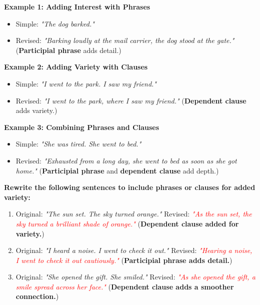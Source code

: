 \documentclass[12pt]{article}
\begin{document}
\begin{tcolorbox}[colframe=black!60, colback=white, 
coltitle=black, colbacktitle=black!15, fonttitle=\bfseries\Large, 
title=Examples, halign title=center, left=10pt, right=10pt, top=10pt, bottom=15pt]

\textbf{Example 1: Adding Interest with Phrases}
\begin{itemize}
    \item Simple: \textit{"The dog barked."}
    \item Revised: \textit{"Barking loudly at the mail carrier, the dog stood at the gate."} (\textbf{Participial phrase} adds detail.)
\end{itemize}

\textbf{Example 2: Adding Variety with Clauses}
\begin{itemize}
    \item Simple: \textit{"I went to the park. I saw my friend."}
    \item Revised: \textit{"I went to the park, where I saw my friend."} (\textbf{Dependent clause} adds variety.)
\end{itemize}

\textbf{Example 3: Combining Phrases and Clauses}
\begin{itemize}
    \item Simple: \textit{"She was tired. She went to bed."}
    \item Revised: \textit{"Exhausted from a long day, she went to bed as soon as she got home."} (\textbf{Participial phrase} and \textbf{dependent clause} add depth.)
\end{itemize}

\end{tcolorbox}

\vspace{1em}

\begin{tcolorbox}[colframe=black!60, colback=white, 
coltitle=black, colbacktitle=black!15, fonttitle=\bfseries\Large, 
title=Guided Practice, halign title=center, left=10pt, right=10pt, top=10pt, bottom=15pt]
\textbf{Rewrite the following sentences to include phrases or clauses for added variety:}
\begin{enumerate}[itemsep=3em]
    \item Original: \textit{"The sun set. The sky turned orange."}  
    Revised: \textcolor{red}{\textit{"As the sun set, the sky turned a brilliant shade of orange."}} (\textbf{Dependent clause added for variety.})

    \item Original: \textit{"I heard a noise. I went to check it out."}  
    Revised: \textcolor{red}{\textit{"Hearing a noise, I went to check it out cautiously."}} (\textbf{Participial phrase adds detail.})

    \item Original: \textit{"She opened the gift. She smiled."}  
    Revised: \textcolor{red}{\textit{"As she opened the gift, a smile spread across her face."}} (\textbf{Dependent clause adds a smoother connection.})
\end{enumerate}
\end{tcolorbox}
\end{document}
